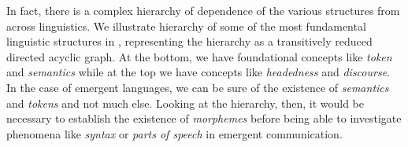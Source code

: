 In fact, there is a complex hierarchy of dependence of the various structures from across linguistics.
We illustrate hierarchy of some of the most fundamental linguistic structures in , representing the hierarchy as a transitively reduced directed acyclic graph.
At the bottom, we have foundational concepts like \emph{token} and \emph{semantics} while at the top we have concepts like \emph{headedness} and \emph{discourse}.
In the case of emergent languages, we can be sure of the existence of \emph{semantics} and \emph{tokens} and not much else.
Looking at the hierarchy, then, it would be necessary to establish the existence of \emph{morphemes} before being able to investigate phenomena like \emph{syntax} or \emph{parts of speech} in emergent communication.





